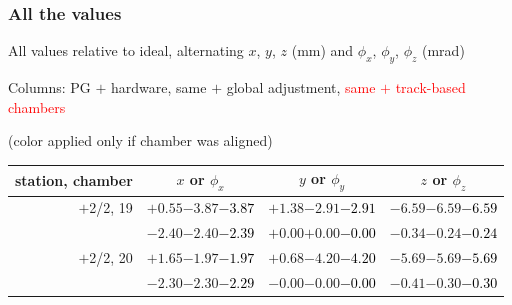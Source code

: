 \documentclass[compress]{beamer}
\begin{document}
\begin{frame}
\frametitle{All the values}
\tiny

All values relative to ideal, alternating $x$, $y$, $z$ (mm) and $\phi_x$, $\phi_y$, $\phi_z$ (mrad)

Columns: PG $+$ hardware, same $+$ global adjustment, \textcolor{red}{same $+$ track-based chambers}

\hfill (color applied only if chamber was aligned)

\vfill
\renewcommand{\arraystretch}{1.1}
\begin{tabular}{r | c | c | c}
station, chamber & $x$ or $\phi_x$ & $y$ or $\phi_y$ & $z$ or $\phi_z$ \\\hline
$+$2/2, 19 & $+0.55$\hspace{0.1 cm}$-3.87$\hspace{0.1 cm}\textcolor{black}{$-3.87$} & $+1.38$\hspace{0.1 cm}$-2.91$\hspace{0.1 cm}\textcolor{black}{$-2.91$} & $-6.59$\hspace{0.1 cm}$-6.59$\hspace{0.1 cm}\textcolor{black}{$-6.59$} \\
           & $-2.40$\hspace{0.1 cm}$-2.40$\hspace{0.1 cm}\textcolor{black}{$-2.39$} & $+0.00$\hspace{0.1 cm}$+0.00$\hspace{0.1 cm}\textcolor{black}{$-0.00$} & $-0.34$\hspace{0.1 cm}$-0.24$\hspace{0.1 cm}\textcolor{black}{$-0.24$} \\
$+$2/2, 20 & $+1.65$\hspace{0.1 cm}$-1.97$\hspace{0.1 cm}\textcolor{black}{$-1.97$} & $+0.68$\hspace{0.1 cm}$-4.20$\hspace{0.1 cm}\textcolor{black}{$-4.20$} & $-5.69$\hspace{0.1 cm}$-5.69$\hspace{0.1 cm}\textcolor{black}{$-5.69$} \\
           & $-2.30$\hspace{0.1 cm}$-2.30$\hspace{0.1 cm}\textcolor{black}{$-2.29$} & $-0.00$\hspace{0.1 cm}$-0.00$\hspace{0.1 cm}\textcolor{black}{$-0.00$} & $-0.41$\hspace{0.1 cm}$-0.30$\hspace{0.1 cm}\textcolor{black}{$-0.30$} \\

\end{tabular}
\end{frame}
\end{document}
